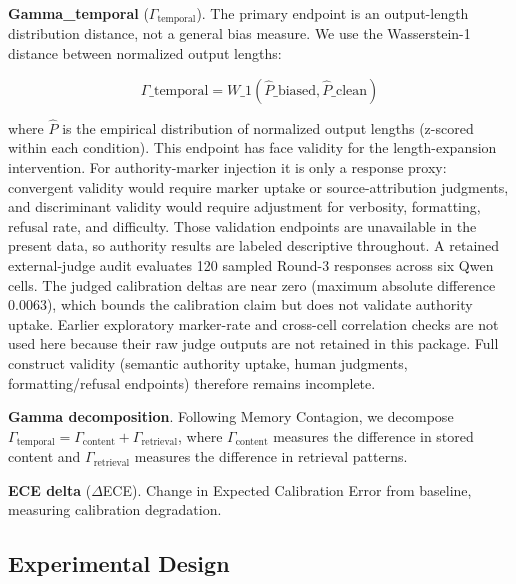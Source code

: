 \documentclass[11pt]{article}
\begin{document}
\textbf{Gamma\_temporal} ($\Gamma_{\text{temporal}}$). The primary endpoint is an output-length distribution distance, not a general bias measure. We use the Wasserstein-1 distance between normalized output lengths:

\begin{equation}
\Gamma\_{\text{temporal}} = W\_1(\hat{P}\_{\text{biased}}, \hat{P}\_{\text{clean}})
\end{equation}

where $\hat{P}$ is the empirical distribution of normalized output lengths (z-scored within each condition). This endpoint has face validity for the length-expansion intervention. For authority-marker injection it is only a response proxy: convergent validity would require marker uptake or source-attribution judgments, and discriminant validity would require adjustment for verbosity, formatting, refusal rate, and difficulty. Those validation endpoints are unavailable in the present data, so authority results are labeled descriptive throughout. A retained external-judge audit evaluates 120 sampled Round-3 responses across six Qwen cells. The judged calibration deltas are near zero (maximum absolute difference $0.0063$), which bounds the calibration claim but does not validate authority uptake. Earlier exploratory marker-rate and cross-cell correlation checks are not used here because their raw judge outputs are not retained in this package. Full construct validity (semantic authority uptake, human judgments, formatting/refusal endpoints) therefore remains incomplete.

\textbf{Gamma decomposition}. Following Memory Contagion, we decompose $\Gamma_{\text{temporal}} = \Gamma_{\text{content}} + \Gamma_{\text{retrieval}}$, where $\Gamma_{\text{content}}$ measures the difference in stored content and $\Gamma_{\text{retrieval}}$ measures the difference in retrieval patterns.

\textbf{ECE delta} ($\Delta$ECE). Change in Expected Calibration Error from baseline, measuring calibration degradation.

\subsection{Experimental Design}
\end{document}
